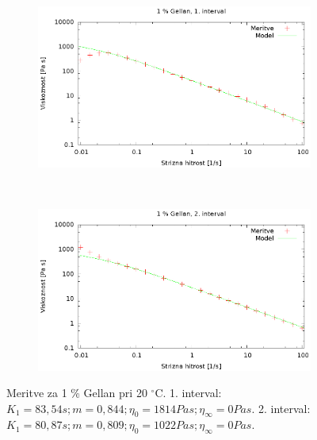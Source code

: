 \documentclass{article}
\begin{document}
\begin{figure}[H]
	\centering
	\begin{subfigure}[b]{0.45\textwidth}
	       \includegraphics[width=\textwidth]{cross_gel1.eps}
	   \end{subfigure}
	   ~
	   \begin{subfigure}[b]{0.45\textwidth}
	       \includegraphics[width=\textwidth]{cross_gel2.eps}
	   \end{subfigure}
	\caption{Meritve za 1 \% Gellan pri 20 $^\circ$C. 1. interval: $K_1 = 83,54 s; m = 0,844; \eta_0 = 1814 Pa s; \eta_\infty = 0 Pa s$. 2. interval: $K_1 = 80,87 s; m = 0,809; \eta_0 = 1022 Pa s; \eta_\infty = 0 Pa s$.}
	\label{fig:cross_gel1}
\end{figure}
\end{document}
